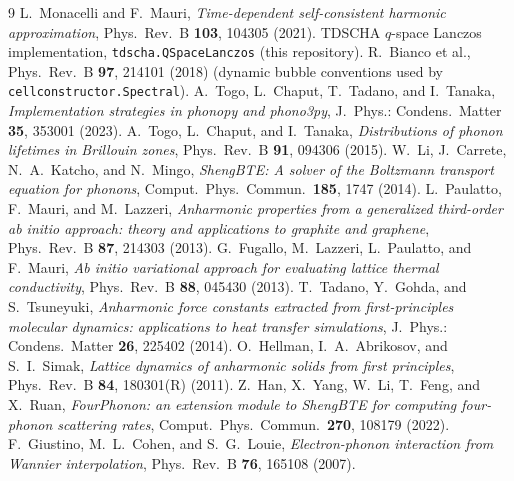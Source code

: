 \documentclass[11pt,a4paper]{article}
\begin{document}
\begin{thebibliography}{9}
 L.~Monacelli and F.~Mauri,
\emph{Time-dependent self-consistent harmonic approximation},
Phys.\ Rev.\ B \textbf{103}, 104305 (2021).
 TDSCHA $q$-space Lanczos implementation,
\texttt{tdscha.QSpaceLanczos} (this repository).
 R.~Bianco et al., Phys.\ Rev.\ B \textbf{97}, 214101
(2018) (dynamic bubble conventions used by
\texttt{cellconstructor.Spectral}).
 A.~Togo, L.~Chaput, T.~Tadano, and I.~Tanaka,
\emph{Implementation strategies in phonopy and phono3py},
J.\ Phys.: Condens.\ Matter \textbf{35}, 353001 (2023).
 A.~Togo, L.~Chaput, and I.~Tanaka,
\emph{Distributions of phonon lifetimes in Brillouin zones},
Phys.\ Rev.\ B \textbf{91}, 094306 (2015).
 W.~Li, J.~Carrete, N.~A.~Katcho, and N.~Mingo,
\emph{ShengBTE: A solver of the Boltzmann transport equation for
phonons}, Comput.\ Phys.\ Commun.\ \textbf{185}, 1747 (2014).
 L.~Paulatto, F.~Mauri, and M.~Lazzeri,
\emph{Anharmonic properties from a generalized third-order ab initio
approach: theory and applications to graphite and graphene},
Phys.\ Rev.\ B \textbf{87}, 214303 (2013).
 G.~Fugallo, M.~Lazzeri, L.~Paulatto, and F.~Mauri,
\emph{Ab initio variational approach for evaluating lattice thermal
conductivity}, Phys.\ Rev.\ B \textbf{88}, 045430 (2013).
 T.~Tadano, Y.~Gohda, and S.~Tsuneyuki,
\emph{Anharmonic force constants extracted from first-principles
molecular dynamics: applications to heat transfer simulations},
J.\ Phys.: Condens.\ Matter \textbf{26}, 225402 (2014).
 O.~Hellman, I.~A.~Abrikosov, and S.~I.~Simak,
\emph{Lattice dynamics of anharmonic solids from first principles},
Phys.\ Rev.\ B \textbf{84}, 180301(R) (2011).
 Z.~Han, X.~Yang, W.~Li, T.~Feng, and X.~Ruan,
\emph{FourPhonon: an extension module to ShengBTE for computing
four-phonon scattering rates}, Comput.\ Phys.\ Commun.\ \textbf{270},
108179 (2022).
 F.~Giustino, M.~L.~Cohen, and S.~G.~Louie,
\emph{Electron-phonon interaction from Wannier interpolation},
Phys.\ Rev.\ B \textbf{76}, 165108 (2007).
\end{thebibliography}
\end{document}
